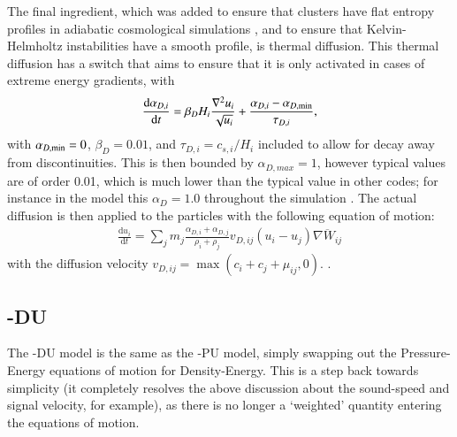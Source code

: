 The final ingredient, which was added to ensure that clusters have flat entropy 
profiles in adiabatic cosmological simulations \citep{Sembolini2016}, and to ensure
that Kelvin-Helmholtz instabilities have a smooth profile, is thermal diffusion. This
thermal diffusion has a switch that aims to ensure that it is only activated in cases
of extreme energy gradients, with
\begin{equation}
    \frac{
        \mathrm{d} \alpha_{D, i}
    }{
        \mathrm{d} t
    } = \beta_D H_i \frac{\nabla^2 u_i}{\sqrt{u_i}} + 
        \frac{\alpha_{D, i} - \alpha_{D, {\rm min}}}{\tau_{D, i}},
\end{equation}
with $\alpha_{D, {\rm min}} = 0$, $\beta_D = 0.01$, and $\tau_{D, i} = c_{s,
i}/{H_i}$ included to allow for decay away from discontinuities. This is then
bounded by $\alpha_{D, max} = 1$, however typical values are of order 0.01,
which is much lower than the typical value in other codes; for instance in
the  model this $\alpha_D = 1.0$ throughout the simulation
\citep{Price2018}. The actual diffusion is then applied to the particles with
the following equation of motion:
\begin{align}
    \frac{
        \mathrm{d}u_i
    }{
        \mathrm{d}t
    } = 
    \sum_j m_j \frac{\alpha_{D, i} + \alpha_{D, j}}{\rho_i + \rho_j} v_{D, ij} (u_i - u_j) \overline{\nabla W_{ij}}
    \label{eqn:energydiff}
\end{align}
with the diffusion velocity $v_{D, ij} = \max(c_i + c_j + \mu_{ij}, 0)$.
.

\subsection{\anarchy{}-DU}

The \anarchy{}-DU model is the same as the \anarchy{}-PU model, simply swapping out the
Pressure-Energy equations of motion for Density-Energy. This is a step back towards
simplicity (it completely resolves the above discussion about the sound-speed and
signal velocity, for example), as there is no longer a `weighted' quantity entering the
equations of motion.

